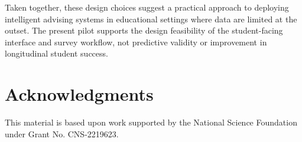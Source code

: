 \documentclass[letterpaper,11pt]{article}
\newcommand{\DIFadd}[1]{%
  \begingroup\setlength{\fboxsep}{0.5pt}%
  \colorbox{diffaddbg}{\textcolor{diffaddtext}{#1}}%
  \endgroup}
\begin{document}
Taken together, these design choices suggest a practical approach to deploying intelligent advising systems in educational settings where data are limited at the outset. \DIFadd{The} \DIFadd{present} \DIFadd{pilot} \DIFadd{supports} \DIFadd{the} \DIFadd{design} \DIFadd{feasibility} \DIFadd{of} \DIFadd{the} \DIFadd{student-facing} \DIFadd{interface} \DIFadd{and} \DIFadd{survey} \DIFadd{workflow,} \DIFadd{not} \DIFadd{predictive} \DIFadd{validity} \DIFadd{or} \DIFadd{improvement} \DIFadd{in} \DIFadd{longitudinal} \DIFadd{student} \DIFadd{success.}

\section{Acknowledgments}

\small

This material is based upon work supported by the National Science Foundation under Grant No. CNS-2219623.

\begin{sloppypar}
\printbibliography[title={REFERENCES}]
\end{sloppypar}
\end{document}
